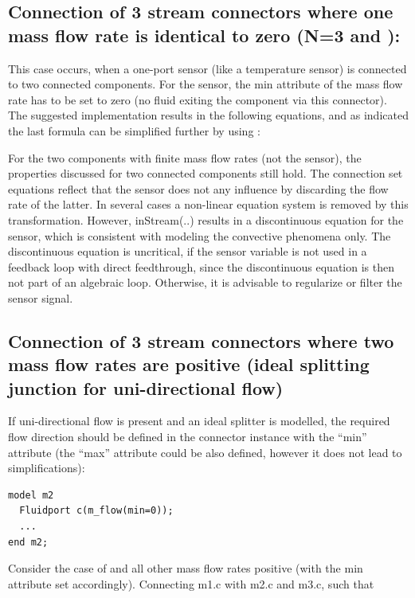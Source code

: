 \documentclass[10pt,a4paper]{report}
\def\doublelabel#1{\label{#1}\hypertarget{#1}{}}
\begin{document}
\subsection{Connection of 3 stream connectors where one mass flow rate is identical to zero (N=3 and ):}\doublelabel{connection-of-3-stream-connectors-where-one-mass-flow-rate-is-identical-to-zero-n-3-and}
This case occurs, when a one-port sensor (like a temperature sensor) is
connected to two connected components. For the sensor, the min attribute
of the mass flow rate has to be set to zero (no fluid exiting the
component via this connector). The suggested implementation results in
the following equations, and as indicated the last formula can be
simplified further by using :

For the two components with finite mass flow rates (not the sensor), the
properties discussed for two connected components still hold. The
connection set equations reflect that the sensor does not any influence
by discarding the flow rate of the latter. In several cases a non-linear
equation system is removed by this transformation. However, inStream(..)
results in a discontinuous equation for the sensor, which is consistent
with modeling the convective phenomena only. The discontinuous equation
is uncritical, if the sensor variable is not used in a feedback loop
with direct feedthrough, since the discontinuous equation is then not
part of an algebraic loop. Otherwise, it is advisable to regularize or
filter the sensor signal.

\subsection{Connection of 3 stream connectors where two mass flow rates are positive (ideal splitting junction for uni-directional flow)}\doublelabel{connection-of-3-stream-connectors-where-two-mass-flow-rates-are-positive-ideal-splitting-junction-for-uni-directional-flow}

If uni-directional flow is present and an ideal splitter is modelled,
the required flow direction should be defined in the connector instance
with the ``min'' attribute (the ``max'' attribute could be also defined,
however it does not lead to simplifications):

\begin{lstlisting}[language=modelica]
model m2
  Fluidport c(m_flow(min=0));
  ...
end m2;
\end{lstlisting}

Consider the case of and all other mass flow rates positive (with the
min attribute set accordingly). Connecting m1.c with m2.c and m3.c, such
that
\end{document}
